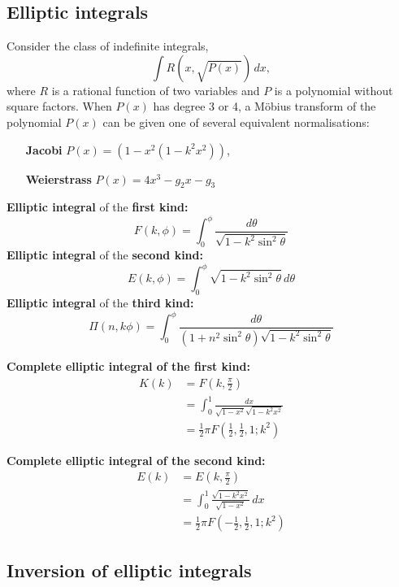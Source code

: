 \documentclass[10pt, oneside, reqno]{amsart}
\theoremstyle{plain}%
\theoremstyle{definition}
\theoremstyle{remark}
\begin{document}
\subsection{Elliptic integrals} %
\label{sub:elliptic_integrals}
Consider the class of indefinite integrals, \[
	\int R(x, \sqrt{P(x)}) \, dx ,
\] where $R$ is a rational function of two variables and $P$ is a polynomial without square factors.  When $P(x)$ has degree 3 or 4, a M\"obius transform of the polynomial $P(x)$ can be given one of several equivalent normalisations:
\begin{itemize}
	\item[\textbf{Jacobi}] $P(x) = (1-x^2(1-k^2 x^2))$,
	\item[\textbf{Weierstrass}] $P(x) = 4x^3 - g_2 x - g_3$
\end{itemize} 

\textbf{Elliptic integral} of the \textbf{first kind:} \[
	F(k, \phi) = \int_0^\phi \frac{d\theta}{\sqrt{1 - k^2 \sin^2 \theta}}
\]
\textbf{Elliptic integral} of the \textbf{second kind:} \[
	E(k, \phi) = \int_0^\phi \sqrt{1 - k^2 \sin^2 \theta} \, d \theta
\]
\textbf{Elliptic integral} of the \textbf{third kind:} \[
	\Pi(n,k \phi) = \int_0^\phi \frac{d \theta}{(1 + n^2 \sin^2 \theta) \sqrt{1 - k^2 \sin^2 \theta}}
\]

\textbf{Complete elliptic integral of the first kind:}\begin{align*}
	K(k) &= F(k, \frac{\pi}{2}) \\
			&= \int_0^1 \frac{dx}{\sqrt{1-x^2}\sqrt{1 - k^2 x^2}} \\
			&= \frac{1}{2} \pi F(\frac{1}{2}, \frac{1}{2}, 1; k^2)
\end{align*}

\textbf{Complete elliptic integral of the second kind:}\begin{align*}
	E(k) &= E(k, \frac{\pi}{2}) \\
			&= \int_0^1 \frac{\sqrt{1-k^2x^2}}{\sqrt{1-x^2}} \, dx \\
			&= \frac{1}{2} \pi F(-\frac{1}{2}, \frac{1}{2}, 1; k^2)
\end{align*}


\subsection{Inversion of elliptic integrals} %

\newcommand{\sn}{\text{sn}\,}
\newcommand{\cn}{\text{cn}\,}
\newcommand{\dn}{\text{dn}\,}
\end{document}
